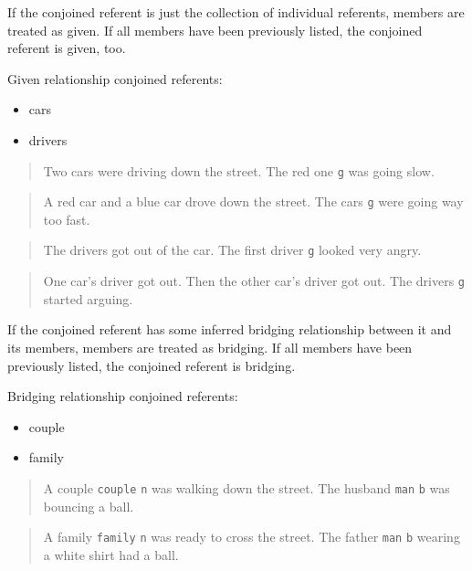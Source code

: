 \documentclass[
]{book}
\providecommand{\tightlist}{%
  \setlength{\itemsep}{0pt}\setlength{\parskip}{0pt}}
\begin{document}
If the conjoined referent is just the collection of individual referents, members are treated as given.
If all members have been previously listed, the conjoined referent is given, too.

Given relationship conjoined referents:

\begin{itemize}
\tightlist
\item
  cars
\item
  drivers
\end{itemize}

\begin{quote}
Two cars were driving down the street.
The red one \texttt{g} was going slow.
\end{quote}

\begin{quote}
A red car and a blue car drove down the street.
The cars \texttt{g} were going way too fast.
\end{quote}

\begin{quote}
The drivers got out of the car.
The first driver \texttt{g} looked very angry.
\end{quote}

\begin{quote}
One car's driver got out.
Then the other car's driver got out.
The drivers \texttt{g} started arguing.
\end{quote}

If the conjoined referent has some inferred bridging relationship between it and its members, members are treated as bridging.
If all members have been previously listed, the conjoined referent is bridging.

Bridging relationship conjoined referents:

\begin{itemize}
\tightlist
\item
  couple
\item
  family
\end{itemize}

\begin{quote}
A couple \texttt{couple} \texttt{n} was walking down the street.
The husband \texttt{man} \texttt{b} was bouncing a ball.
\end{quote}

\begin{quote}
A family \texttt{family} \texttt{n} was ready to cross the street.
The father \texttt{man} \texttt{b} wearing a white shirt had a ball.
\end{quote}
\end{document}
